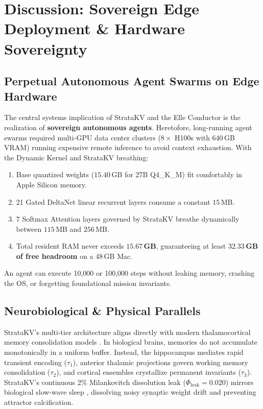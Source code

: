 \documentclass[11pt,letterpaper]{article}
\theoremstyle{definition}
\begin{document}
\section{Discussion: Sovereign Edge Deployment \& Hardware Sovereignty}
\label{sec:discussion}

\subsection{Perpetual Autonomous Agent Swarms on Edge Hardware}
The central systems implication of StrataKV and the Elle Conductor is the realization of \textbf{sovereign autonomous agents}. Heretofore, long-running agent swarms required multi-GPU data center clusters ($8\times$ H100s with 640\,GB VRAM) running expensive remote inference to avoid context exhaustion. With the Dynamic Kernel and StrataKV breathing:
\begin{enumerate}
    \item Base quantized weights ($15.40$\,GB for 27B Q4\_K\_M) fit comfortably in Apple Silicon memory.
    \item 21 Gated DeltaNet linear recurrent layers consume a constant $15$\,MB.
    \item 7 Softmax Attention layers governed by StrataKV breathe dynamically between $115$\,MB and $256$\,MB.
    \item Total resident RAM never exceeds \textbf{$15.67$\,GB}, guaranteeing at least \textbf{$32.33$\,GB of free headroom} on a 48\,GB Mac.
\end{enumerate}
An agent can execute 10,000 or 100,000 steps without leaking memory, crashing the OS, or forgetting foundational mission invariants.

\subsection{Neurobiological \& Physical Parallels}
StrataKV's multi-tier architecture aligns directly with modern thalamocortical memory consolidation models \cite{rajasethupathy2025}. In biological brains, memories do not accumulate monotonically in a uniform buffer. Instead, the hippocampus mediates rapid transient encoding ($\tau_1$), anterior thalamic projections govern working memory consolidation ($\tau_2$), and cortical ensembles crystallize permanent invariants ($\tau_3$). StrataKV's continuous 2\% Milankovitch dissolution leak ($\Phi_{\text{leak}} = 0.020$) mirrors biological slow-wave sleep \cite{barteau2026phiphase}, dissolving noisy synaptic weight drift and preventing attractor calcification.
\end{document}
